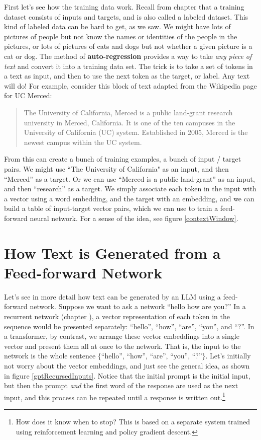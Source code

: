 First let's see how the training data work. Recall from chapter  that a training dataset consists of inputs and targets, and is also called a labeled dataset. This kind of labeled data can be hard to get, as we saw.  We might have lots of pictures of people but not know the names or identities of the people in the pictures, or lots of pictures of cats and dogs but not whether a given picture is a cat or dog.  The method of  \textbf{auto-regression} provides a way to take \emph{any piece of text} and convert it into a training data set. The trick is to take a set of tokens in a text as input, and then to use the next token as the target, or label.  Any text will do! For example, consider this block of text adapted from the Wikipedia page for UC Merced:

\begin{quote}
The University of California, Merced is a public land-grant research university in Merced, California. It is one of the ten campuses in the University of California (UC) system. Established in 2005, Merced is the newest campus within the UC system.
\end{quote}

From this can create a bunch of training examples, a bunch of input / target pairs. We might use ``The University of California" as an input, and then ``Merced'' as a target. Or we can use ``Merced is a public land-grant'' as an input, and then ``research'' as a target.  We simply associate each token in the input with a vector using a word embedding, and the target with an embedding, and we can build a table of input-target vector pairs, which we can use to train a feed-forward neural network.  For a sense of the idea, see figure \ref{contextWindow}. 

  
\section{How Text is Generated from a Feed-forward Network}


Let's see in more detail how text can be generated by an LLM using a feed-forward network. Suppose we want to ask a network ``hello how are you?'' In a recurrent network (chapter ), a vector representation of each token in the sequence would be presented separately: ``hello'', ``how'', ``are'', ``you'', and ``?''.  In a transformer, by contrast, we arrange these vector embeddings into a single vector and present them all at once to the network. That is, the input to the network is the whole sentence $\{$``hello'', ``how'', ``are'', ``you'', ``?''$\}$. Let's initially not worry about the vector embeddings, and just see the general idea, as shown in figure \ref{gptRecursedInputs}. Notice that the initial prompt is the initial input, but then the prompt \emph{and} the first word of the response are used as the next input, and this process can be repeated until a response is written out.\footnote{How does it know when to stop? This is based on a separate system trained using reinforcement learning and policy gradient descent.}
  
